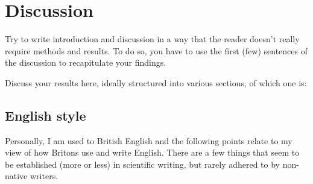 \chapter{Discussion}
\label{ch:discussion}

Try to write introduction and discussion in a way that the reader doesn't really require methods and results. To do so, you have to use the first (few) sentences of the discussion to recapitulate your findings.

Discuss your results here, ideally structured into various sections, of which one is:


\section{English style}
Personally, I am used to British English and the following points relate to my view of how Britons use and write English. There are a few things that seem to be established (more or less) in scientific writing, but rarely adhered to by non-native writers.

